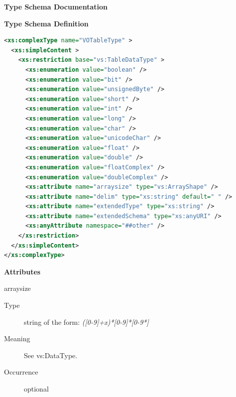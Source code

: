 \documentclass[11pt,a4paper]{ivoa}
\begin{document}
\begin{generated}
\begingroup
        \renewcommand*\descriptionlabel[1]{%
        \hbox to 5.5em{\emph{#1}\hfil}}\vspace{2ex}\noindent\textbf{ Type Schema Documentation}


\vspace{1ex}\noindent\textbf{ Type Schema Definition}

\begin{lstlisting}[language=XML,basicstyle=\footnotesize]
<xs:complexType name="VOTableType" >
  <xs:simpleContent >
    <xs:restriction base="vs:TableDataType" >
      <xs:enumeration value="boolean" />
      <xs:enumeration value="bit" />
      <xs:enumeration value="unsignedByte" />
      <xs:enumeration value="short" />
      <xs:enumeration value="int" />
      <xs:enumeration value="long" />
      <xs:enumeration value="char" />
      <xs:enumeration value="unicodeChar" />
      <xs:enumeration value="float" />
      <xs:enumeration value="double" />
      <xs:enumeration value="floatComplex" />
      <xs:enumeration value="doubleComplex" />
      <xs:attribute name="arraysize" type="vs:ArrayShape" />
      <xs:attribute name="delim" type="xs:string" default=" " />
      <xs:attribute name="extendedType" type="xs:string" />
      <xs:attribute name="extendedSchema" type="xs:anyURI" />
      <xs:anyAttribute namespace="##other" />
    </xs:restriction>
  </xs:simpleContent>
</xs:complexType>
\end{lstlisting}

\vspace{0.5ex}\noindent\textbf{ Attributes}

\begingroup\small\begin{bigdescription}
\item[arraysize]
\begin{description}
\item[Type] string of the form: \emph{([0-9]+x)*[0-9]*[0-9*]}
\item[Meaning] See vs:DataType.
\item[Occurrence] optional


\end{description}
\end{bigdescription}
\end{generated}
\end{document}
